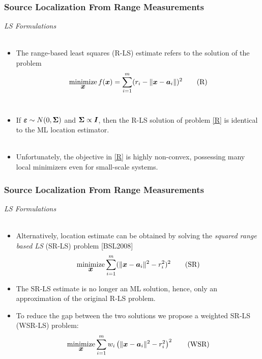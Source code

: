 \documentclass [t] {beamer} %
\begin{document}
\begin{frame} %
\frametitle{Source Localization From Range Measurements}
{\large \textit{LS Formulations}} \\~\\
\normalsize
\begin{itemize}
\item 
The range-based least squares (R-LS) estimate refers to the solution of the problem
\begin{equation} \label{R} 
\mathop{\mbox{minimize}}_{\mbox{\boldmath$x$}} f(\mbox{\boldmath$x$})=\sum_{i=1}^{m} (r_i - \|{\mbox{\boldmath$x$}} - {\mbox{\boldmath$a$}}_i\|)^2	\tag{R}
\end{equation} \\
\item If $\mbox{\boldmath${\varepsilon}$} \sim N(0,\mbox{\boldmath${\Sigma}$}) $ and $\mbox{\boldmath${\Sigma}$} \propto \mbox{\boldmath$I$}$, then the R-LS solution of problem \eqref{R} is identical to the ML location estimator. \\ ~\\
 \item  Unfortunately, the objective in \eqref{R} is highly non-convex, possessing many local minimizers even for small-scale systems.
\end{itemize}
\end{frame}



\begin{frame}
\frametitle{Source Localization From Range Measurements}
{\large \textit{LS Formulations}} \\~\\
\normalsize
\begin{itemize}
\item 
Alternatively, location estimate can be obtained by solving the \textit{squared range based LS} (SR-LS) problem [BSL2008]
\begin{equation} \label{SR}
\mathop{\mbox{minimize}}_{\mbox{\boldmath$x$}} \sum_{i=1}^{m} (\|{\mbox{\boldmath$x$}} - {\mbox{\boldmath$a$}}_i\|^2 - r_i^2)^2 \tag{SR}
\end{equation}

\item  
The SR-LS estimate is no longer an ML solution, hence, only an approximation of the original R-LS problem.\\
\item 
To reduce the gap between the two solutions we propose a weighted SR-LS (WSR-LS) problem:
\begin{equation} \label{WSR}
\mathop{\mbox{minimize}}_{\mbox{\boldmath$x$}} \sum_{i=1}^{m} w_i\left(\|{\mbox{\boldmath$x$}} - {\mbox{\boldmath$a$}}_i\|^2 - r_i^2\right)^2 \tag{WSR}
\end{equation}
\end{itemize}
\end{frame}
\end{document}
